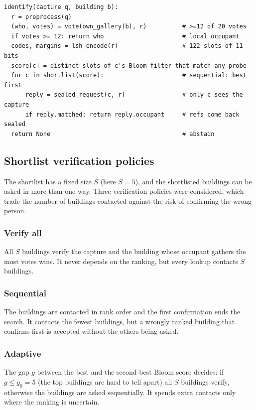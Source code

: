 \documentclass[12pt,a4paper,oneside]{report}
\begin{document}
{\footnotesize
\begin{verbatim}
identify(capture q, building b):
  r = preprocess(q)
  (who, votes) = vote(own_gallery(b), r)          # >=12 of 20 votes
  if votes >= 12: return who                      # local occupant
  codes, margins = lsh_encode(r)                  # 122 slots of 11 bits
  score[c] = distinct slots of c's Bloom filter that match any probe
  for c in shortlist(score):                      # sequential: best first
      reply = sealed_request(c, r)                # only c sees the capture
      if reply.matched: return reply.occupant     # refs come back sealed
  return None                                     # abstain
\end{verbatim}}

\subsection{Shortlist verification policies}\label{sec:policies}
The shortlist has a fixed size $S$ (here $S=5$), and the shortlisted buildings can be asked in more than one way. Three verification policies were considered, which trade the number of buildings contacted against the risk of confirming the wrong person.

\subsubsection{Verify all}
All $S$ buildings verify the capture and the building whose occupant gathers the most votes wins. It never depends on the ranking, but every lookup contacts $S$ buildings.

\subsubsection{Sequential}
The buildings are contacted in rank order and the first confirmation ends the search. It contacts the fewest buildings, but a wrongly ranked building that confirms first is accepted without the others being asked.

\subsubsection{Adaptive}
The gap $g$ between the best and the second-best Bloom score decides: if $g\le g_0=5$ (the top buildings are hard to tell apart) all $S$ buildings verify, otherwise the buildings are asked sequentially. It spends extra contacts only where the ranking is uncertain.
\end{document}
